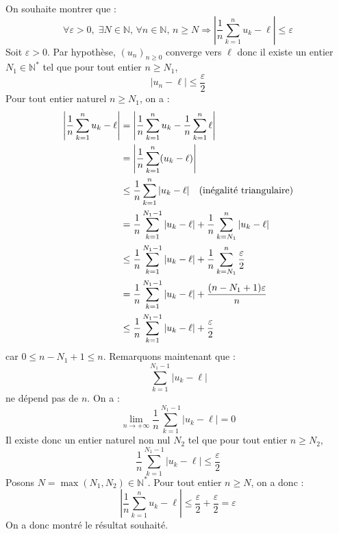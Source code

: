 \documentclass[a4paper,twoside,french,10pt]{VcCours}
\begin{document}
On souhaite montrer que :
$$ \forall \varepsilon>0, \; \exists N \in \mathbb{N}, \, \forall n \in \mathbb{N}, \, n \geq N \Longrightarrow \left\vert \frac{1}{n} \sum_{k=1}^n u_k - \ell \right\vert \leq \varepsilon$$
Soit $\varepsilon>0$. Par hypothèse, $(u_n)_{n \geq 0}$ converge vers $\ell$ donc il existe un entier $N_1 \in \mathbb{N}^*$ tel que pour tout entier $n \geq N_1$,
$$ \vert u_n - \ell \vert \leq \dfrac{\varepsilon}{2}$$
Pour tout entier naturel $n \geq N_1$, on a :
\begin{align*}
\left\vert \frac{1}{n} \sum_{k=1}^n u_k - \ell \right\vert & = \left\vert \frac{1}{n} \sum_{k=1}^n u_k - \frac{1}{n} \sum_{k=1}^n \ell \right\vert \\
& = \left\vert \frac{1}{n} \sum_{k=1}^n (u_k - \ell) \right\vert \\
& \leq \dfrac{1}{n} \sum_{k=1}^n \vert u_k - \ell \vert  \quad \hbox{(inégalité triangulaire)} \\
& = \dfrac{1}{n} \sum_{k=1}^{N_1-1} \vert u_k - \ell \vert + \dfrac{1}{n} \sum_{k=N_1}^n \vert u_k - \ell \vert \\
& \leq \dfrac{1}{n} \sum_{k=1}^{N_1-1} \vert u_k - \ell \vert + \dfrac{1}{n} \sum_{k=N_1}^n \dfrac{\varepsilon}{2} \\
& = \dfrac{1}{n} \sum_{k=1}^{N_1-1} \vert u_k - \ell \vert + \dfrac{(n-N_1+1) \varepsilon}{n}  \\
& \leq  \dfrac{1}{n} \sum_{k=1}^{N_1-1} \vert u_k - \ell \vert +\dfrac{\varepsilon}{2} \\
\end{align*}
car $0 \leq n-N_1+1 \leq n$. Remarquons maintenant que :
$$\sum_{k=1}^{N_1-1} \vert u_k - \ell \vert$$
ne dépend pas de $n$. On a :
$$ \lim_{n \rightarrow + \infty} \dfrac{1}{n} \sum_{k=1}^{N_1-1} \vert u_k - \ell \vert = 0$$
Il existe donc un entier naturel non nul $N_2$ tel que pour tout entier $n \geq N_2$,
$$ \dfrac{1}{n} \sum_{k=1}^{N_1-1} \vert u_k - \ell \vert \leq \dfrac{\varepsilon}{2}$$
Posons $N= \max(N_1, N_2) \in \mathbb{N}^*$. Pour tout entier $n \geq N$, on a donc :
$$ \left\vert \frac{1}{n} \sum_{k=1}^n u_k - \ell \right\vert \leq \dfrac{\varepsilon}{2} +  \dfrac{\varepsilon}{2} = \varepsilon$$
On a donc montré le résultat souhaité. 
\end{document}
